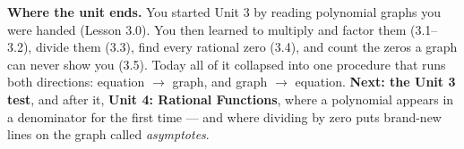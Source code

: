\documentclass[10pt]{article}
\begin{document}
\begin{spiralbox}
\textbf{Where the unit ends.} You started Unit 3 by reading polynomial graphs you were handed
(Lesson 3.0). You then learned to multiply and factor them (3.1--3.2), divide them (3.3), find every
rational zero (3.4), and count the zeros a graph can never show you (3.5). Today all of it collapsed
into one procedure that runs both directions: equation $\rightarrow$ graph, and graph $\rightarrow$
equation. \textbf{Next: the Unit 3 test}, and after it, \textbf{Unit 4: Rational Functions}, where a
polynomial appears in a denominator for the first time --- and where dividing by zero puts brand-new
lines on the graph called \emph{asymptotes}.
\end{spiralbox}
\end{document}
